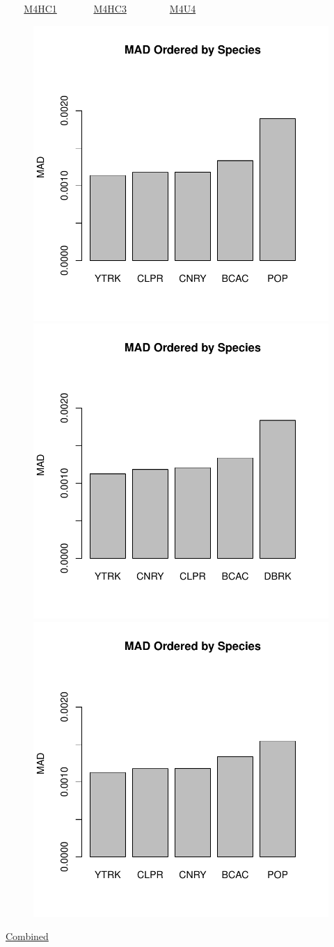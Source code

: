 \documentclass[ xcolor = pdftex, dvipsnames, table ]{beamer}
\begin{document}
%
\begin{frame}{$~~~~~~~$ \href{https://github.com/gasduster99/sppComp/tree/master/sscRuns/26919781982M4HC1}{M4HC1} $~~~~~~~~~~~~~~$ \href{https://github.com/gasduster99/sppComp/tree/master/sscRuns/26919781982M4HC3}{M4HC3} $~~~~~~~~~~~~~~~~~$ \href{https://github.com/gasduster99/sppComp/tree/master/sscRuns/26919781982M4U4}{M4U4} }
        \begin{figure}[ht!]
        \centering
        \hspace*{-1cm}
        \includegraphics[width=.4\textwidth]{../sscRuns/26919781982M4HC1/sppHeadMad68.pdf}
        \includegraphics[width=.4\textwidth]{../sscRuns/26919781982M4HC3/sppHeadMad68.pdf}
        \includegraphics[width=.4\textwidth]{../sscRuns/26919781982M4U4/sppHeadMad68.pdf}
        \end{figure}
	\vspace{-1cm}
	\begin{center}
	\Large
	\href{https://github.com/gasduster99/sppComp/tree/master/try1/postSSC/26919781982M4HC1HC3U4}{Combined}
	\end{center}
\end{frame}
\end{document}
